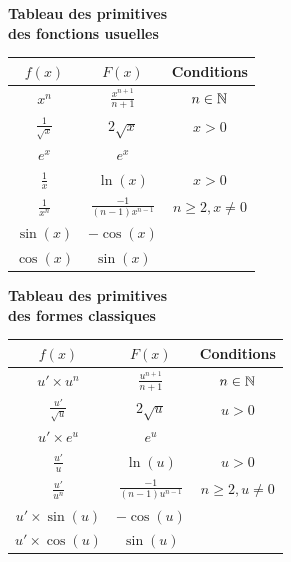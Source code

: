 \documentclass[oneside,12pt]{book}          %
\begin{document}
\begin{minipage}[t]{0.44\textwidth}
\center
\textbf{\large Tableau des primitives\\des fonctions usuelles}\\[10pt]
\renewcommand{\arraystretch}{2}

\begin{tabular}{ | c | c | c |} \hline
   
$f(x)$ & $F(x)$ & Conditions \\ \hline \hline
$x^n$ & $\frac{x^{n+1}}{n+1}$ & ${n\in\mathbb N}$ \\ \hline
$\frac{1}{\sqrt{x}}$ & $2\sqrt{x}$ & $x>0$ \\ \hline
$e^x$ & $e^x$ & \\ \hline
$\frac{1}{x}$ & $\ln(x)$ & $x>0$ \\ \hline
$\frac{1}{x^n}$ & $\frac{-1}{(n-1)x^{n-1}}$ & $n\geq2 , x\neq0$ \\ \hline
$\sin(x)$ & $-\cos(x)$ & \\ \hline
$\cos(x)$ & $\sin(x)$ & \\ \hline
\end{tabular}
\end{minipage}
\begin{minipage}[t]{0.54\textwidth}
\center
\textbf{\large Tableau des primitives\\des formes classiques}\\[10pt]
\renewcommand{\arraystretch}{2}

\begin{tabular}{ | c | c | c |}\hline
$f(x)$ & $F(x)$ & Conditions \\ \hline \hline
$u'\times u^n$ & $\frac{u^{n+1}}{n+1}$ & ${n\in\mathbb N}$ \\ \hline
$\frac{u'}{\sqrt{u}}$ & $2\sqrt{u}$ & $u>0$ \\ \hline
$u'\times e^u$ & $e^u$ & \\ \hline
$\frac{u'}{u}$ & $\ln(u)$ & $u>0$ \\ \hline
$\frac{u'}{u^n}$ & $\frac{-1}{(n-1)u^{n-1}}$ & $n\geq2,u\neq0$ \\ \hline
$u'\times\sin(u)$ & $-\cos(u)$ & \\ \hline
$u'\times\cos(u)$ & $\sin(u)$ & \\ \hline 
\end{tabular}

\end{minipage}


%
\end{document}
